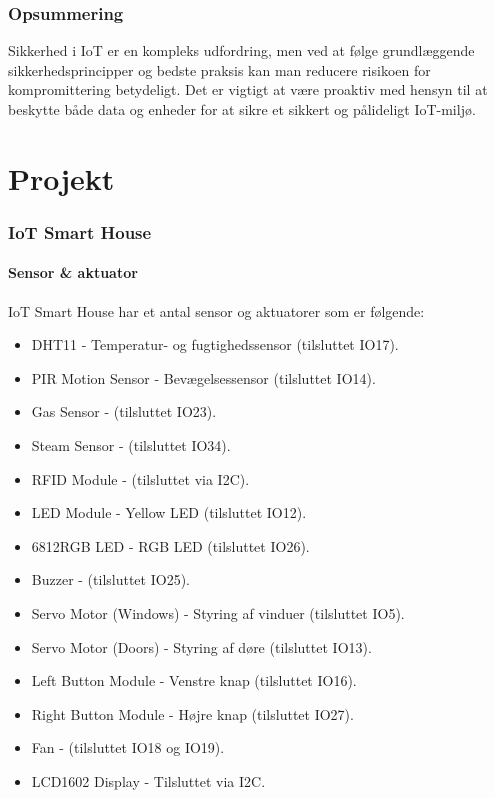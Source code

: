 \documentclass[12pt,a4paper]{book}
\begin{document}
	\section*{Opsummering}
	Sikkerhed i IoT er en kompleks udfordring, men ved at følge grundlæggende sikkerhedsprincipper og bedste praksis kan man reducere risikoen for kompromittering betydeligt. Det er vigtigt at være proaktiv med hensyn til at beskytte både data og enheder for at sikre et sikkert og pålideligt IoT-miljø.
	
	\part{Projekt}
	\section{IoT Smart House}
	\subsection*{Sensor \& aktuator}
	IoT Smart House har et antal sensor og aktuatorer som er følgende:
	\begin{itemize}
		\item DHT11 - Temperatur- og fugtighedssensor (tilsluttet IO17).
		\item PIR Motion Sensor - Bevægelsessensor (tilsluttet IO14).
		\item Gas Sensor - (tilsluttet IO23).
		\item Steam Sensor - (tilsluttet IO34).
		\item RFID Module - (tilsluttet via I2C).
		\item LED Module - Yellow LED (tilsluttet IO12).
		\item 6812RGB LED - RGB LED (tilsluttet IO26).
		\item Buzzer - (tilsluttet IO25).
		\item Servo Motor (Windows) - Styring af vinduer (tilsluttet IO5).
		\item Servo Motor (Doors) - Styring af døre (tilsluttet IO13).
		\item Left Button Module - Venstre knap (tilsluttet IO16).
		\item Right Button Module - Højre knap (tilsluttet IO27).
		\item Fan - (tilsluttet IO18 og IO19).
		\item LCD1602 Display - Tilsluttet via I2C.
	\end{itemize}
	
\end{document}
